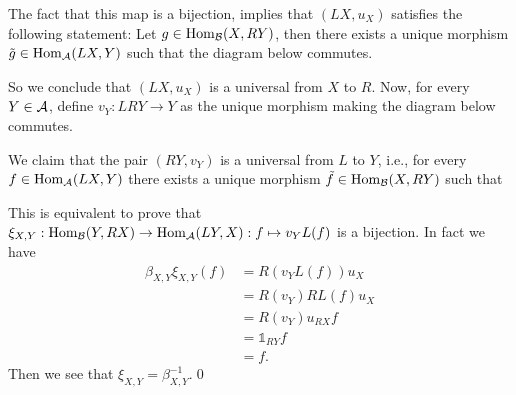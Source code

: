 The fact that this map is a bijection, implies that $(LX, u_X)$ satisfies the following statement: Let 
$g\in\text{Hom}_{\mathcal{B}}(X,RY)$, then there exists a unique morphism $\tilde{g}\in\text{Hom}_{\mathcal{A}}(LX,Y)$ such that the diagram below
commutes. 
\begin{center}
\end{center}
So we conclude that $(LX,u_X)$ is a universal from $X$ to $R$. Now, for every $Y\in\mathcal{A}$, define 
$v_Y: LRY\to Y$ as the unique morphism making the diagram below commutes.
\begin{center}
\end{center}
We claim that the pair $(RY, v_Y)$ is a universal from $L$ to $Y$, i.e., for every $f\in\text{Hom}_{\mathcal{A}}(LX, Y)$ 
there exists a unique morphism $\tilde{f}\in\text{Hom}_{\mathcal{B}}(X,RY)$ such that 
\begin{center}
\end{center}
This is equivalent to prove that $\xi_{X,Y}:\text{Hom}_{\mathcal{B}}(Y,RX)\to\text{Hom}_{\mathcal{A}}(LY,X):f\mapsto v_YL(f)$ is 
a bijection. In fact we have 
\begin{equation}
    \begin{split}
        \beta_{X,Y}\xi_{X,Y}(f)&=R(v_YL(f))u_X\\
        &=R(v_Y)RL(f)u_X\\
        &=R(v_Y)u_{RX}f\\
        &=\mathds{1}_{RY}f\\
        &=f.
    \end{split}
\end{equation}
Then we see that $\xi_{X,Y}=\beta_{X,Y}^{-1}$.\qed 

